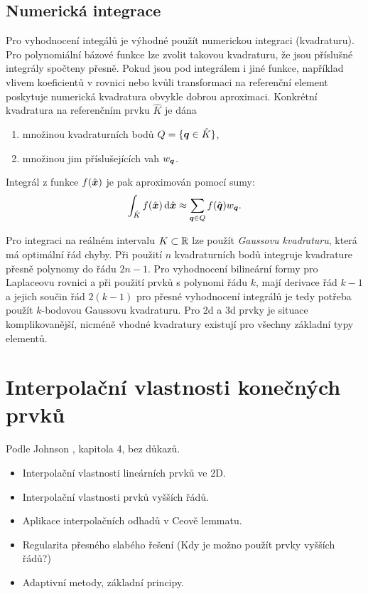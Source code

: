 \subsection{Numerická integrace}
Pro vyhodnocení integálů je výhodné použít numerickou integraci (kvadraturu). Pro polynomiální bázové funkce lze zvolit takovou kvadraturu, že jsou 
příslušné integrály spočteny přesně. Pokud jsou pod integrálem i jiné funkce, například vlivem koeficientů v rovnici nebo kvůli 
transformaci na referenční element poskytuje numerická kvadratura obvykle dobrou aproximaci. Konkrétní kvadratura na referenčním prvku $\hat K$ je dána
\begin{enumerate}
 \item množinou kvadraturních bodů $Q=\{\mathbf{\boldsymbol{q}} \in \hat K\}$,
 \item množinou jim příslušejících vah $w_{\mathbf{\boldsymbol{q}}}$.
\end{enumerate}
Integrál z funkce $f(\hat{\mathbf{\boldsymbol{x}}})$ je pak aproximován pomocí sumy:
\[
    \int_{\hat K} f(\hat{\mathbf{\boldsymbol{x}}}) \,{\rm d} \hat{\mathbf{\boldsymbol{x}}} \approx \sum_{\mathbf{\boldsymbol{q}}\in Q} f(\hat{\mathbf{\boldsymbol{q}}}) w_{\mathbf{\boldsymbol{q}}}.
\]

Pro integraci na reálném intervalu $K\subset {\mathbb R}$ lze použít {\it Gaussovu kvadraturu},  která má optimální řád chyby. Při použití $n$ kvadraturních bodů integruje
kvadrature přesně polynomy do řádu $2n-1$. Pro vyhodnocení bilineární formy pro Laplaceovu rovnici a při použití prvků s polynomi řádu $k$, mají derivace řád $k-1$ a 
jejich součin řád $2(k-1)$ pro přesné vyhodnocení integrálů je tedy potřeba použít $k$-bodovou Gaussovu kvadraturu. Pro 2d a 3d prvky je situace komplikovanější,
nicméně vhodné kvadratury existují pro všechny základní typy elementů.

\section{Interpolační vlastnosti konečných prvků}
Podle Johnson \cite{Johnson}, kapitola 4, bez důkazů.
\begin{itemize}
 \item Interpolační vlastnosti lineárních prvků ve 2D.
 \item Interpolační vlastnosti prvků vyšších řádů.
 \item Aplikace interpolačních odhadů v Ceově lemmatu.
 \item Regularita přesného slabého řešení (Kdy je možno použít prvky vyšších řádů?)
 \item Adaptivní metody, základní principy.
\end{itemize}

% 






